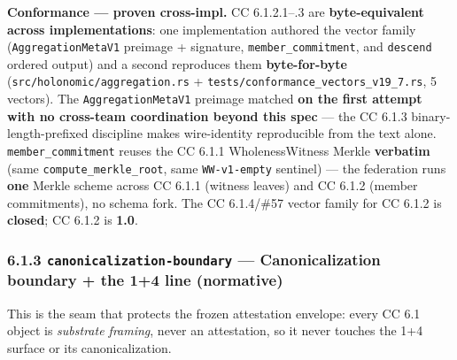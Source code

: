 \documentclass[11pt]{article}
\begin{document}
\textbf{Conformance — proven cross-impl.} CC 6.1.2.1–.3 are \textbf{byte-equivalent across implementations}: one implementation authored the vector family (\texttt{AggregationMetaV1} preimage + signature, \texttt{member\_commitment}, and \texttt{descend} ordered output) and a second reproduces them \textbf{byte-for-byte} (\texttt{src/holonomic/aggregation.rs} + \texttt{tests/conformance\_vectors\_v19\_7.rs}, 5 vectors). The \texttt{AggregationMetaV1} preimage matched \textbf{on the first attempt with no cross-team coordination beyond this spec} — the CC 6.1.3 binary-length-prefixed discipline makes wire-identity reproducible from the text alone. \texttt{member\_commitment} reuses the CC 6.1.1 WholenessWitness Merkle \textbf{verbatim} (same \texttt{compute\_merkle\_root}, same \texttt{WW-v1-empty} sentinel) — the federation runs \textbf{one} Merkle scheme across CC 6.1.1 (witness leaves) and CC 6.1.2 (member commitments), no schema fork. The CC 6.1.4/\#57 vector family for CC 6.1.2 is \textbf{closed}; CC 6.1.2 is \textbf{1.0}.


\subsubsection*{6.1.3 \texttt{canonicalization-boundary} — Canonicalization boundary + the 1+4 line (normative)}


This is the seam that protects the frozen attestation envelope: every CC 6.1 object is \textit{substrate framing}, never an attestation, so it never touches the 1+4 surface or its canonicalization.
\end{document}
